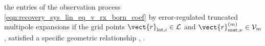 the entries of
the observation process
\eqref{eqn:recovery_sys_lin_eq_v_rx_born_coef} by
error-regulated truncated multipole expansions if
the grid points
$\vect{r}_{\text{lat}, i} \in \mathcal{L}$ and
$\vect{r}_{\text{mat}, \nu}^{(m)} \in \mathcal{V}_{m}$, satisfied
a specific geometric relationship
\cite[Chapt. 9]{book:Gibson2014},
\cite{article:CoifmanIAPM1993}.

